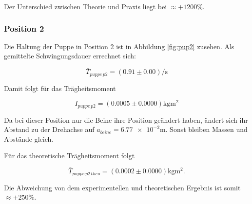 Der Unterschied zwischen Theorie und Praxis liegt bei $\approx +1200 \%$. %

\subsubsection{Position 2}
Die Haltung der Puppe in Position 2 ist in Abbildung \ref{fig:pup2} zusehen.
Als gemittelte Schwingungsdauer errechnet sich:

\begin{equation*}
\bar{T}_{puppe\, p2}=\left(\num{0.91}\pm\num{0.00}\right) \si{\per\second}
\end{equation*}

Damit folgt für das Trägheitsmoment

\begin{equation}
\label{eq:traeg_puppe_p2}
I_{puppe \,p2}= \left(\num{0.0005}\pm\num{0.0000}\right)\si{\kilogram\meter\squared}
\end{equation}

Da bei dieser Position nur die Beine ihre Position geändert haben, ändert
sich ihr Abstand zu der Drehachse auf $a_{beine}=\num{6.77e-2}\si{\meter}$.
Sonst bleiben Massen und Abstände gleich.

Für das theoretische Trägheitsmoment folgt

\begin{equation*}
\bar{T}_{puppe\, p2\,theo}=\left(\num{0.0002}\pm\num{0.0000}\right) \si{\kilogram\meter\squared}.
\end{equation*}

Die Abweichung von dem experimentellen und theoretischen Ergebnis ist
somit $\approx +250 \%$. %
